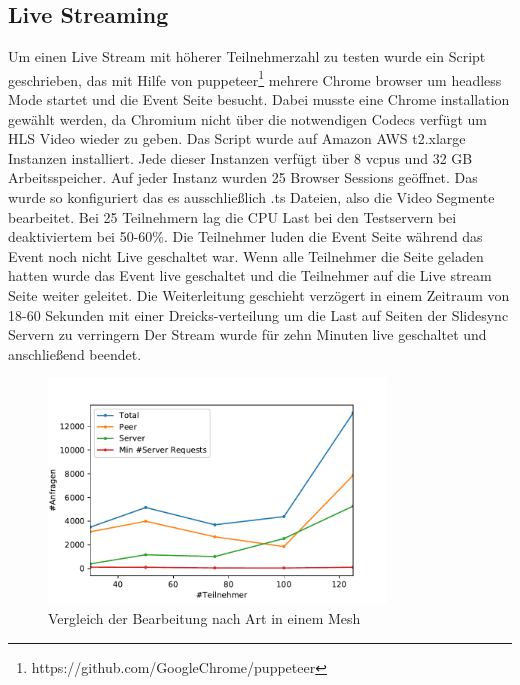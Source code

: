 \subsection{Live Streaming}
Um einen Live Stream mit höherer Teilnehmerzahl zu testen wurde ein Script geschrieben, das mit Hilfe von puppeteer\footnote{https://github.com/GoogleChrome/puppeteer} mehrere Chrome browser um headless Mode startet und die Event Seite besucht. Dabei musste eine Chrome installation gewählt werden, da Chromium nicht über die notwendigen Codecs verfügt um HLS Video wieder zu geben. 
Das Script wurde auf Amazon AWS t2.xlarge Instanzen installiert. Jede dieser Instanzen verfügt über 8 vcpus und 32 GB Arbeitsspeicher. Auf jeder Instanz wurden 25 Browser Sessions geöffnet.  Das \cdn wurde so konfiguriert das es ausschließlich .ts Dateien, also die Video Segmente bearbeitet. Bei 25 Teilnehmern lag die CPU Last bei den Testservern bei deaktiviertem \pTp \cdn bei 50-60\%. 
Die Teilnehmer luden die Event Seite während das Event noch nicht Live geschaltet war. Wenn alle Teilnehmer die Seite geladen hatten wurde das Event live geschaltet und die Teilnehmer auf die Live stream Seite weiter geleitet. Die Weiterleitung geschieht verzögert in einem Zeitraum von 18-60 Sekunden mit einer Dreicks-verteilung um die Last auf Seiten der Slidesync Servern zu verringern Der Stream wurde für zehn Minuten live geschaltet und anschließend beendet.

\begin{figure}[!h]
	\centering
	\includegraphics[width=0.8\textwidth]{figures/single_mesh_line}
	\caption[A Figure Short-Title]{Vergleich der Bearbeitung nach Art in einem Mesh}
	\label{fig:single_mesh_line}
\end{figure}

